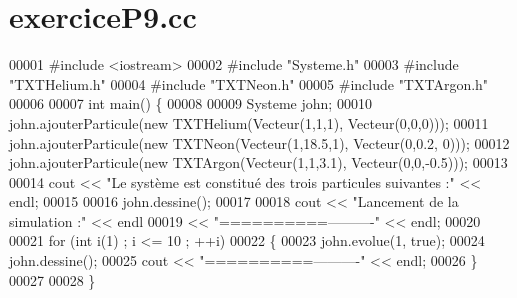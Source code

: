 \section{exercice\+P9.\+cc}
\label{exercice_p9_8cc_source}

\begin{DoxyCode}
00001 \textcolor{preprocessor}{#include <iostream>}
00002 \textcolor{preprocessor}{#include "Systeme.h"}
00003 \textcolor{preprocessor}{#include "TXTHelium.h"}
00004 \textcolor{preprocessor}{#include "TXTNeon.h"}
00005 \textcolor{preprocessor}{#include "TXTArgon.h"}
00006 
00007 \textcolor{keywordtype}{int} main() \{
00008     
00009     Systeme john;
00010     john.ajouterParticule(\textcolor{keyword}{new} TXTHelium(Vecteur(1,1,1), Vecteur(0,0,0)));
00011     john.ajouterParticule(\textcolor{keyword}{new} TXTNeon(Vecteur(1,18.5,1), Vecteur(0,0.2, 0)));
00012     john.ajouterParticule(\textcolor{keyword}{new} TXTArgon(Vecteur(1,1,3.1), Vecteur(0,0,-0.5)));
00013     
00014     cout << \textcolor{stringliteral}{"Le système est constitué des trois particules suivantes :"} << endl;
00015     
00016     john.dessine();
00017     
00018     cout << \textcolor{stringliteral}{"Lancement de la simulation :"} << endl
00019          << \textcolor{stringliteral}{"==========----------"} << endl;
00020     
00021     \textcolor{keywordflow}{for} (\textcolor{keywordtype}{int} i(1) ; i <= 10 ; ++i)
00022     \{
00023         john.evolue(1, \textcolor{keyword}{true});
00024         john.dessine();
00025         cout << \textcolor{stringliteral}{"==========----------"} << endl;
00026     \}
00027     
00028 \}
\end{DoxyCode}
